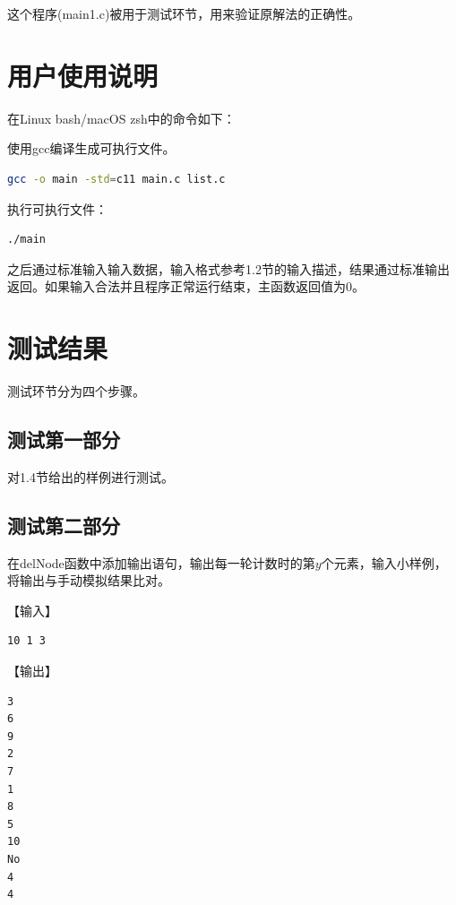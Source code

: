 \documentclass{article}
\begin{document}
这个程序(main1.c)被用于测试环节，用来验证原解法的正确性。

\section{用户使用说明}

在Linux bash/macOS zsh中的命令如下：

使用gcc编译生成可执行文件。

\begin{lstlisting}[language={bash},
    basicstyle=\small\menlo]
gcc -o main -std=c11 main.c list.c
\end{lstlisting}

执行可执行文件：

\begin{lstlisting}[language={bash},
    basicstyle=\small\menlo]
./main
\end{lstlisting}

之后通过标准输入输入数据，输入格式参考1.2节的输入描述，结果通过标准输出返回。如果输入合法并且程序正常运行结束，主函数返回值为0。

\section{测试结果}

测试环节分为四个步骤。

\subsection{测试第一部分}

对1.4节给出的样例进行测试。

\subsection{测试第二部分}

在delNode函数中添加输出语句，输出每一轮计数时的第$y$个元素，输入小样例，将输出与手动模拟结果比对。

【输入】

\begin{lstlisting}[language={bash},
    basicstyle=\small\menlo]
10 1 3
\end{lstlisting}

【输出】

\begin{lstlisting}[language={bash},
    basicstyle=\small\menlo]
3
6
9
2
7
1
8
5
10
No
4
4
\end{lstlisting}
\end{document}
